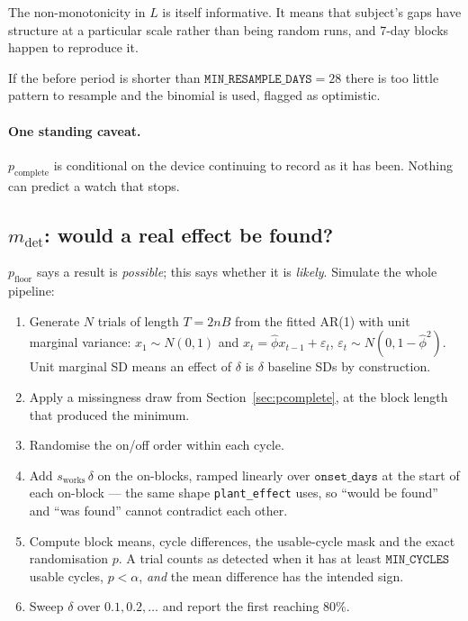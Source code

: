 \documentclass{article}
\theoremstyle{plain}
\theoremstyle{definition}
\theoremstyle{remark}
\numberwithin{equation}{section}
\begin{document}
The non-monotonicity in $L$ is itself informative. It means that subject's gaps
have structure at a particular scale rather than being random runs, and 7-day
blocks happen to reproduce it.

If the before period is shorter than $\texttt{MIN\_RESAMPLE\_DAYS} = 28$ there
is too little pattern to resample and the binomial is used, flagged as
optimistic.

\paragraph{One standing caveat.} $p_{\mathrm{complete}}$ is conditional on the
device continuing to record as it has been. Nothing can predict a watch that
stops.

\subsection{$m_{\mathrm{det}}$: would a real effect be found?}
\label{sec:mdet}

$p_{\mathrm{floor}}$ says a result is \emph{possible}; this says whether it is
\emph{likely}. Simulate the whole pipeline:

\begin{enumerate}[nosep]
  \item Generate $N$ trials of length $T = 2nB$ from the fitted AR(1) with unit
    marginal variance: $x_1 \sim N(0,1)$ and
    $x_t = \hat\phi x_{t-1} + \varepsilon_t$,
    $\varepsilon_t \sim N(0, 1-\hat\phi^2)$. Unit marginal SD means an effect
    of $\delta$ is $\delta$ baseline SDs by construction.
  \item Apply a missingness draw from Section~\ref{sec:pcomplete}, at the block
    length that produced the minimum.
  \item Randomise the on/off order within each cycle.
  \item Add $s_{\mathrm{works}}\,\delta$ on the on-blocks, ramped linearly over
    $\texttt{onset\_days}$ at the start of each on-block --- the same shape
    \texttt{plant\_effect} uses, so ``would be found'' and ``was found'' cannot
    contradict each other.
  \item Compute block means, cycle differences, the usable-cycle mask and the
    exact randomisation $p$. A trial counts as detected when it has at least
    $\texttt{MIN\_CYCLES}$ usable cycles, $p < \alpha$, \emph{and} the mean
    difference has the intended sign.
  \item Sweep $\delta$ over $0.1, 0.2, \dots$ and report the first reaching
    $80\%$.
\end{enumerate}
\end{document}

